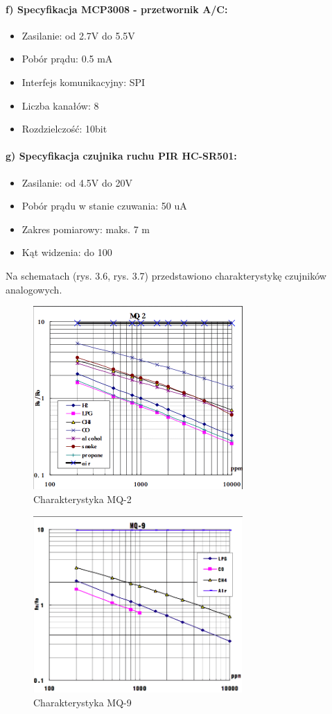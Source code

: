 \paragraph{f) Specyfikacja MCP3008 - przetwornik A/C\cite{specyfikacjaAC}:}
\begin{itemize} 
\item Zasilanie: od 2.7V do 5.5V
\item Pobór prądu: 0.5 mA
\item Interfejs komunikacyjny: SPI
\item Liczba kanałów: 8
\item Rozdzielczość: 10bit
\end{itemize}
\paragraph{g) Specyfikacja czujnika ruchu PIR HC-SR501\cite{pir}:}
\begin{itemize} 
\item Zasilanie: od 4.5V do 20V
\item Pobór prądu w stanie czuwania: 50 uA
\item Zakres pomiarowy: maks. 7 m
\item Kąt widzenia: do 100\textdegree{}
\end{itemize}
Na schematach (rys. 3.6, rys. 3.7) przedstawiono charakterystykę czujników analogowych.
\begin{figure}[ht]
	\centering
	\includegraphics[width=8cm]{MQ2}
	\caption{Charakterystyka MQ-2 \cite{mq2}}
\end{figure}
\begin{figure}[ht]
	\centering
	\includegraphics[width=8cm]{MQ9}
	\caption{Charakterystyka MQ-9 \cite{mq9}}
\end{figure}
